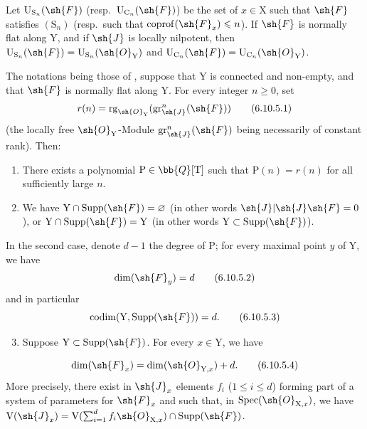 \begin{corollary}[6.10.4]
\label{IV.6.10.4}
Let $\mathrm{U}_{\mathrm{S}_n}(\sh{F})$ (resp.\ $\mathrm{U}_{\mathrm{C}_n}(\sh{F})$) be the set of $x\in\mathrm{X}$ such that $\sh{F}$ satisfies $(\mathrm{S}_n)$ (resp.\ such that $\operatorname{coprof}(\sh{F}_x)\leqslant n$). If $\sh{F}$ is normally flat along $\mathrm{Y}$, and if $\sh{J}$ is locally nilpotent, then $\mathrm{U}_{\mathrm{S}_n}(\sh{F})=\mathrm{U}_{\mathrm{S}_n}(\sh{O}_\mathrm{Y})$ and $\mathrm{U}_{\mathrm{C}_n}(\sh{F})=\mathrm{U}_{\mathrm{C}_n}(\sh{O}_\mathrm{Y})$.
\end{corollary}

\begin{proposition}[6.10.5]
\label{IV.6.10.5}
The notations being those of , suppose that $\mathrm{Y}$ is connected and non-empty, and that $\sh{F}$ is normally flat along $\mathrm{Y}$. For every integer $n\geqslant 0$, set
\begin{equation}
  r(n) = \operatorname{rg}_{\sh{O}_\mathrm{Y}}(\operatorname{gr}^n_\sh{J}(\sh{F})) \tag{6.10.5.1}\label{IV.6.10.5.1}
\end{equation}
(the locally free $\sh{O}_\mathrm{Y}$-Module $\operatorname{gr}^n_\sh{J}(\sh{F})$ being necessarily of constant rank). Then:
\begin{enumerate}[label=(\roman*)]
  \item There exists a polynomial $\mathrm{P}\in\bb{Q}[\mathrm{T}]$ such that $\mathrm{P}(n)=r(n)$ for all sufficiently large $n$.
  \item We have $\mathrm{Y}\cap\operatorname{Supp}(\sh{F})=\varnothing$ (in other words $\sh{J}|\sh{J}\sh{F}=0$), or $\mathrm{Y}\cap\operatorname{Supp}(\sh{F})=\mathrm{Y}$ (in other words $\mathrm{Y}\subset\operatorname{Supp}(\sh{F})$).
\end{enumerate}
In the second case, denote $d-1$ the degree of $\mathrm{P}$; for every maximal point $y$ of $\mathrm{Y}$, we have
\begin{equation}
  \dim(\sh{F}_y) = d \tag{6.10.5.2}\label{IV.6.10.5.2}
\end{equation}
and in particular
\begin{equation}
  \operatorname{codim}(\mathrm{Y},\operatorname{Supp}(\sh{F})) = d. \tag{6.10.5.3}\label{IV.6.10.5.3}
\end{equation}
\begin{enumerate}[label=(\roman*)]
\setcounter{enumi}{2}
  \item Suppose $\mathrm{Y}\subset\operatorname{Supp}(\sh{F})$. For every $x\in\mathrm{Y}$, we have
\end{enumerate}
\begin{equation}
  \dim(\sh{F}_x) = \dim(\sh{O}_{\mathrm{Y},x}) + d. \tag{6.10.5.4}\label{IV.6.10.5.4}
\end{equation}
More precisely, there exist in $\sh{J}_x$ elements $f_i$ ($1\leqslant i\leqslant d$) forming part of a system of parameters for $\sh{F}_x$  and such that, in $\operatorname{Spec}(\sh{O}_{\mathrm{X},x})$, we have $\mathrm{V}(\sh{J}_x)=\mathrm{V}(\sum_{i=1}^d f_i\sh{O}_{\mathrm{X},x})\cap\operatorname{Supp}(\sh{F})$.
\end{proposition}

